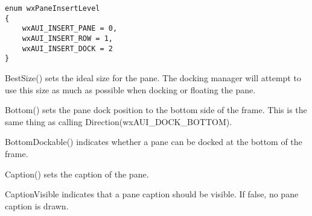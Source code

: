\begin{verbatim}
enum wxPaneInsertLevel
{
    wxAUI_INSERT_PANE = 0,
    wxAUI_INSERT_ROW = 1,
    wxAUI_INSERT_DOCK = 2
}
\end{verbatim}



\label{wxauipaneinfowxauipaneinfo}





\label{wxauipaneinfodtor}



\label{wxauipaneinfobestsize}


BestSize() sets the ideal size for the pane.  The docking manager will attempt to use this size as much as possible when docking or floating the pane.

\label{wxauipaneinfobottom}


Bottom() sets the pane dock position to the bottom side of the frame.  This is the same thing as calling Direction(wxAUI_DOCK_BOTTOM).

\label{wxauipaneinfobottomdockable}


BottomDockable() indicates whether a pane can be docked at the bottom of the frame.

\label{wxauipaneinfocaption}


Caption() sets the caption of the pane.

\label{wxauipaneinfocaptionvisible}


CaptionVisible indicates that a pane caption should be visible.  If false, no pane caption is drawn.

